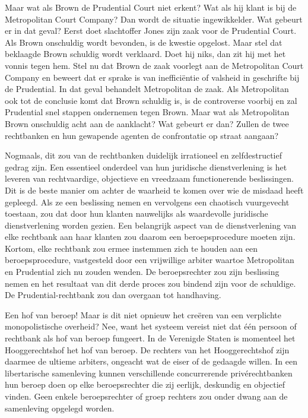 \documentclass[
  a5paper,
  smalldemyvopaper,10pt,twoside,onecolumn,openright,extrafontsizes,hidelinks]{memoir}
\begin{document}
Maar wat als Brown de Prudential Court niet erkent? Wat als hij klant is
bij de Metropolitan Court Company? Dan wordt de situatie ingewikkelder.
Wat gebeurt er in dat geval? Eerst doet slachtoffer Jones zijn zaak voor
de Prudential Court. Als Brown onschuldig wordt bevonden, is de kwestie
opgelost. Maar stel dat beklaagde Brown schuldig wordt verklaard. Doet
hij niks, dan zit hij met het vonnis tegen hem. Stel nu dat Brown de
zaak voorlegt aan de Metropolitan Court Company en beweert dat er sprake
is van inefficiëntie of valsheid in geschrifte bij de Prudential. In dat
geval behandelt Metropolitan de zaak. Als Metropolitan ook tot de
conclusie komt dat Brown schuldig is, is de controverse voorbij en zal
Prudential snel stappen ondernemen tegen Brown. Maar wat als
Metropolitan Brown onschuldig acht aan de aanklacht? Wat gebeurt er dan?
Zullen de twee rechtbanken en hun gewapende agenten de confrontatie op
straat aangaan?

Nogmaals, dit zou van de rechtbanken duidelijk irrationeel en
zelfdestructief gedrag zijn. Een essentieel onderdeel van hun juridische
dienstverlening is het leveren van rechtvaardige, objectieve en
vreedzaam functionerende beslissingen. Dit is de beste manier om achter
de waarheid te komen over wie de misdaad heeft gepleegd. Als ze een
beslissing nemen en vervolgens een chaotisch vuurgevecht toestaan, zou
dat door hun klanten nauwelijks als waardevolle juridische
dienstverlening worden gezien. Een belangrijk aspect van de
dienstverlening van elke rechtbank aan haar klanten zou daarom een
beroepsprocedure moeten zijn. Kortom, elke rechtbank zou ermee instemmen
zich te houden aan een beroepsprocedure, vastgesteld door een
vrijwillige arbiter waartoe Metropolitan en Prudential zich nu zouden
wenden. De beroepsrechter zou zijn beslissing nemen en het resultaat van
dit derde proces zou bindend zijn voor de schuldige. De
Prudential-rechtbank zou dan overgaan tot handhaving.

Een hof van beroep! Maar is dit niet opnieuw het creëren van een
verplichte monopolistische overheid? Nee, want het systeem vereist niet
dat één persoon of rechtbank als hof van beroep fungeert. In de
Verenigde Staten is momenteel het Hooggerechtshof het hof van beroep. De
rechters van het Hooggerechtshof zijn daarmee de ultieme arbiters,
ongeacht wat de eiser of de gedaagde willen. In een libertarische
samenleving kunnen verschillende concurrerende privérechtbanken hun
beroep doen op elke beroepsrechter die zij eerlijk, deskundig en
objectief vinden. Geen enkele beroepsrechter of groep rechters zou onder
dwang aan de samenleving opgelegd worden.
\end{document}
